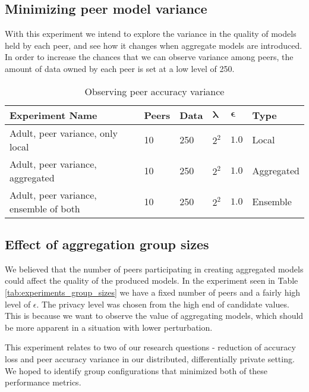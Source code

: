 \subsection{Minimizing peer model variance}

With this experiment we intend to explore the variance in the quality of models held by each peer, and see how it changes when aggregate models are introduced. In order to increase the chances that we can observe variance among peers, the amount of data owned by each peer is set at a low level of 250.

\begin{table}[h]
	\centering
	\begin{tabular}{|l|l|l|l|l|l|}
		{\bf Experiment Name}                  & {\bf Peers} & {\bf Data} & $\boldsymbol{\lambda}$ & $\boldsymbol{\epsilon}$ & {\bf Type} \\
		\hline
		Adult, peer variance, only local       & 10          & 250        & $2^{2}$   & $1.0$      & Local      \\
		Adult, peer variance, aggregated       & 10          & 250        & $2^{2}$   & $1.0$      & Aggregated \\
		Adult, peer variance, ensemble of both & 10          & 250        & $2^{2}$   & $1.0$      & Ensemble  
	\end{tabular}
	\caption{Observing peer accuracy variance}
	\label{tab:experiments_peer_variance}
\end{table}

\subsection{Effect of aggregation group sizes}

We believed that the number of peers participating in creating aggregated models could affect the quality of the produced models. In the experiment seen in Table \ref{tab:experiments_group_sizes} we have a fixed number of peers and a fairly high level of $\epsilon$. The privacy level was chosen from the high end of candidate values. This is because we want to observe the value of aggregating models, which should be more apparent in a situation with lower perturbation. 

This experiment relates to two of our research questions - reduction of accuracy loss and peer accuracy variance in our distributed, differentially private setting. We hoped to identify group configurations that minimized both of these performance metrics.

